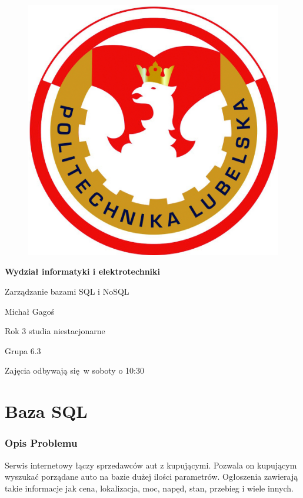 \documentclass[a4paper,11pt]{article}
\begin{document}

\begin{figure}[h]
\centering
\includegraphics{logo_politechniki_lubelskiej.jpg}
\end{figure}

\begin{center}
\textbf{\large Wydział informatyki i elektrotechniki}

Zarządzanie bazami SQL i NoSQL

Michał Gagoś

Rok 3 studia niestacjonarne

Grupa 6.3

Zajęcia odbywają się w soboty o 10:30
\end{center}


\pagebreak
\part{Baza SQL}
\section*{Opis Problemu}
Serwis internetowy łączy sprzedawców aut z kupującymi. Pozwala on kupującym wyszukać porządane auto na bazie dużej ilości parametrów.
Ogłoszenia zawierają takie informacje jak cena, lokalizacja, moc, napęd, stan, przebieg i wiele innych.
\end{document}
